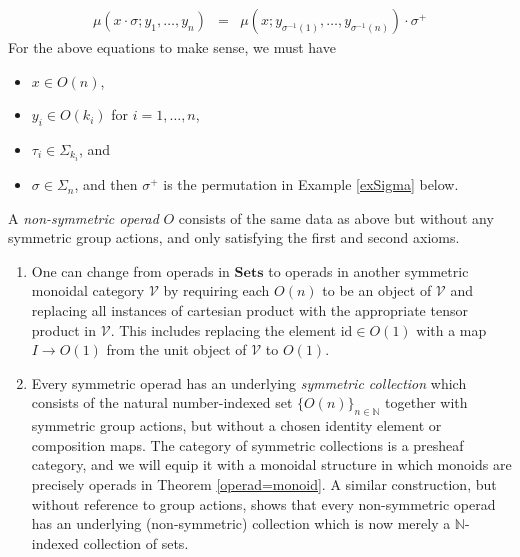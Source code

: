 \documentclass{amsbook} %
\newcommand{\mb}{\mathbf}
\newcommand{\N}{\mathbb{N}}
\numberwithin{section}{chapter}
\begin{document}
\begin{Defi}
\begin{enumerate}
\[\begin{array}{rcl}
\mu(x \cdot \sigma; y_{1}, \ldots, y_{n}) & =  & \mu(x; y_{\sigma^{-1}(1)}, \ldots, y_{\sigma^{-1}(n)}) \cdot \sigma^{+}
\end{array}
\]
For the above equations to make sense, we must have
\begin{itemize}
\item $x \in O(n)$,
\item $y_{i} \in O(k_{i})$ for $i=1, \ldots, n$,
\item $\tau_{i} \in \Sigma_{k_{i}}$, and
\item $\sigma \in \Sigma_{n}$, and then $\sigma^{+}$ is the permutation in Example \ref{exSigma} below.
\end{itemize}
\end{enumerate}
\end{Defi}

\begin{Defi}
A \emph{non-symmetric operad} $O$ consists of the same data as above but without any symmetric group actions, and only satisfying the first and second axioms.
\end{Defi}

\begin{rem}
\begin{enumerate}
\item One can change from operads in $\mb{Sets}$ to operads in another symmetric monoidal category $\mathcal{V}$ by requiring each $O(n)$ to be an object of $\mathcal{V}$ and replacing all instances of cartesian product with the appropriate tensor product in $\mathcal{V}$.  This includes replacing the element $\textrm{id} \in O(1)$ with a map $I \rightarrow O(1)$ from the unit object of $\mathcal{V}$ to $O(1)$.
\item Every symmetric operad has an underlying \textit{symmetric collection} which consists of the natural number-indexed set $\{ O(n) \}_{n \in \N}$ together with symmetric group actions, but without a chosen identity element or composition maps.  The category of symmetric collections is a presheaf category, and we will equip it with a monoidal structure in which monoids are precisely operads in Theorem \ref{operad=monoid}.  A similar construction, but without reference to group actions, shows that every non-symmetric operad has an underlying (non-symmetric) collection which is now merely a $\N$-indexed collection of sets.
\end{enumerate}
\end{rem}
\end{document}

